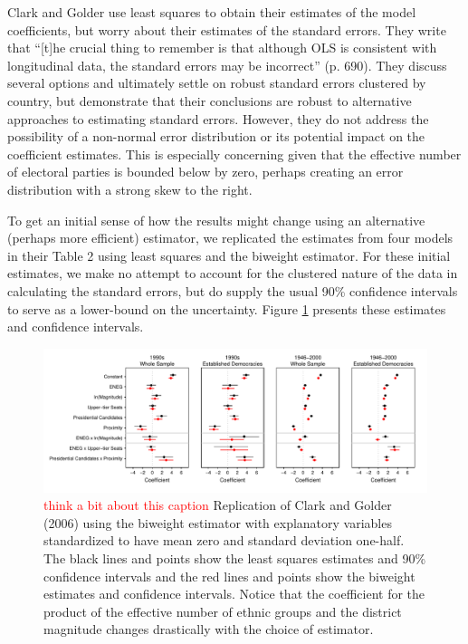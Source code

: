 \documentclass[12pt]{article}
\newcommand{\ctk}[1]{\textcolor{red}{#1}}
\begin{document}
Clark and Golder use least squares to obtain their estimates of the model coefficients, but worry about their estimates of the standard errors. 
They write that ``[t]he crucial thing to remember is that although OLS is consistent with longitudinal data, the standard errors may be incorrect'' (p. 690). 
They discuss several options and ultimately settle on robust standard errors clustered by country, but demonstrate that their conclusions are robust to alternative approaches to estimating standard errors. 
However, they do not address the possibility of a non-normal error distribution or its potential impact on the coefficient estimates. 
This is especially concerning given that the effective number of electoral parties is bounded below by zero, perhaps creating an error distribution with a strong skew to the right. 

To get an initial sense of how the results might change using an alternative (perhaps more efficient) estimator, we replicated the estimates from four models in their Table 2 using least squares and the biweight estimator. 
For these initial estimates, we make no attempt to account for the clustered nature of the data in calculating the standard errors, but do supply the usual 90\% confidence intervals to serve as a lower-bound on the uncertainty. 
Figure \ref{fig:cg-coef-plots} presents these estimates and confidence intervals.

\begin{figure}[h!]
\begin{center}
\includegraphics[scale = .8]{figs/cg-coef-plots.pdf}
\caption{\ctk{think a bit about this caption} Replication of Clark and Golder (2006) using the biweight estimator with explanatory variables standardized to have mean zero and standard deviation one-half. 
The black lines and points show the least squares estimates and 90\% confidence intervals and the red lines and points show the biweight estimates and confidence intervals. 
Notice that the coefficient for the product of the effective number of ethnic groups and the district magnitude changes drastically with the choice of estimator.}\label{fig:cg-coef-plots}
\end{center}
\end{figure}
\end{document}
